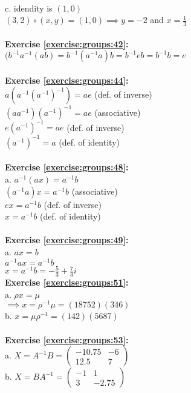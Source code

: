 \\
c. idendity is $(1,0)$\\
$(3,2)\circ(x,y)=(1,0)\implies y=-2$ and $x=\displaystyle\frac{1}{3}$\\
\\
\textbf{Exercise \ref{exercise:groups:42}:}\\
$(b^{-1}a^{-1}(ab)=b^{-1}(a^{-1}a)b=b^{-1}eb=b^{-1}b=e$\\
\\
\textbf{Exercise \ref{exercise:groups:44}:}\\
$a(a^{-1}(a^{-1})^{-1})=ae$ (def. of inverse)\\
$(aa^{-1})(a^{-1})^{-1}=ae$ (associative)\\
$e(a^{-1})^{-1}=ae$ (def. of inverse)\\
$(a^{-1})^{-1}=a$ (def. of identity)\\
\\
\textbf{Exercise \ref{exercise:groups:48}:}\\
a. $a^{-1}(ax)=a^{-1}b$\\
$(a^{-1}a)x=a^{-1}b$ (associative)\\
$ex=a^{-1}b$ (def. of inverse)\\
$x=a^{-1}b$ (def. of identity)\\
\\
\textbf{Exercise \ref{exercise:groups:49}:}\\
a. $ax=b$\\
$a^{-1}ax=a^{-1}b$\\
$x=a^{-1}b=-\displaystyle\frac{5}{3}+\displaystyle\frac{7}{3}i$
\\
\textbf{Exercise \ref{exercise:groups:51}:}\\
a. $\rho x=\mu$\\
$\implies x=\rho^{-1}\mu=(18752)(346)$\\
b. $x=\mu\rho^{-1}=(142)(5687)$\\
\\
\textbf{Exercise \ref{exercise:groups:53}:}\\
a. $X=A^{-1}B=\begin{pmatrix}
-10.75 & -6\\
12.5 & 7
\end{pmatrix}$\\
b. $X=BA^{-1}=\begin{pmatrix}
-1 & 1\\
3 & -2.75
\end{pmatrix}$\\
\\
